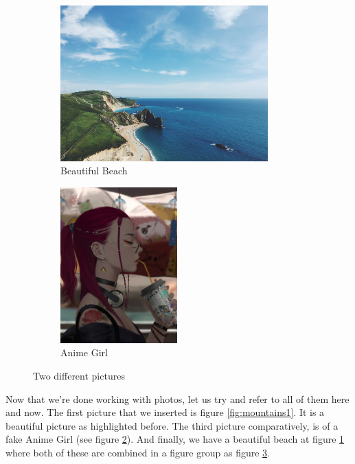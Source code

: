 \documentclass[12pt, a4paper]{article}
\begin{document}
	\begin{figure}[h]
		\begin{subfigure}{0.5\textwidth}
			\includegraphics[width=0.9\linewidth, height=6cm]{beach}
			\caption{Beautiful Beach}
			\label{fig:beach1}
		\end{subfigure}
		\begin{subfigure}{0.5\textwidth}
			\includegraphics[width=0.9\linewidth, height=6cm]{girl}
			\caption{Anime Girl}
			\label{fig:girl1}
		\end{subfigure}
		
		\caption{Two different pictures}
		\label{fig:twoimg}
	\end{figure}
	
	Now that we're done working with photos, let us try and refer to all of them
	here and now. The first picture that we inserted is figure \ref{fig:mountains1}.
	It is a beautiful picture as highlighted before. The third picture comparatively,
	is of a fake Anime Girl (see figure \ref{fig:girl1}). And finally, we have a
	beautiful beach at figure \ref{fig:beach1} where both of these are combined in a
	figure group as figure \ref{fig:twoimg}.
	
\end{document}
